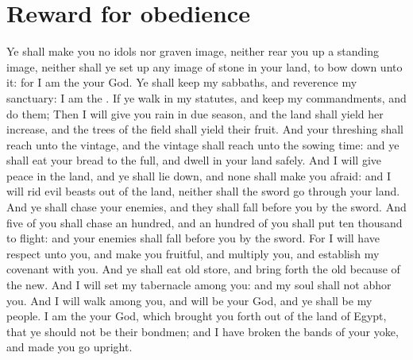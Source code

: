 \section*{Reward for obedience}
\begin{biblechapter} %
\verse Ye shall make you no idols nor graven image, neither rear you up a standing image, neither shall ye set up any image of stone in your land, to bow down unto it: for I am the \LORD your God.
\verse Ye shall keep my sabbaths, and reverence my sanctuary: I am the \LORD.
\verse If ye walk in my statutes, and keep my commandments, and do them;
\verse Then I will give you rain in due season, and the land shall yield her increase, and the trees of the field shall yield their fruit.
\verse And your threshing shall reach unto the vintage, and the vintage shall reach unto the sowing time: and ye shall eat your bread to the full, and dwell in your land safely.
\verse And I will give peace in the land, and ye shall lie down, and none shall make you afraid: and I will rid evil beasts out of the land, neither shall the sword go through your land.
\verse And ye shall chase your enemies, and they shall fall before you by the sword.
\verse And five of you shall chase an hundred, and an hundred of you shall put ten thousand to flight: and your enemies shall fall before you by the sword.
\verse For I will have respect unto you, and make you fruitful, and multiply you, and establish my covenant with you.
\verse And ye shall eat old store, and bring forth the old because of the new.
\verse And I will set my tabernacle among you: and my soul shall not abhor you.
\verse And I will walk among you, and will be your God, and ye shall be my people.
\verse I am the \LORD your God, which brought you forth out of the land of Egypt, that ye should not be their bondmen; and I have broken the bands of your yoke, and made you go upright.

\end{biblechapter}
